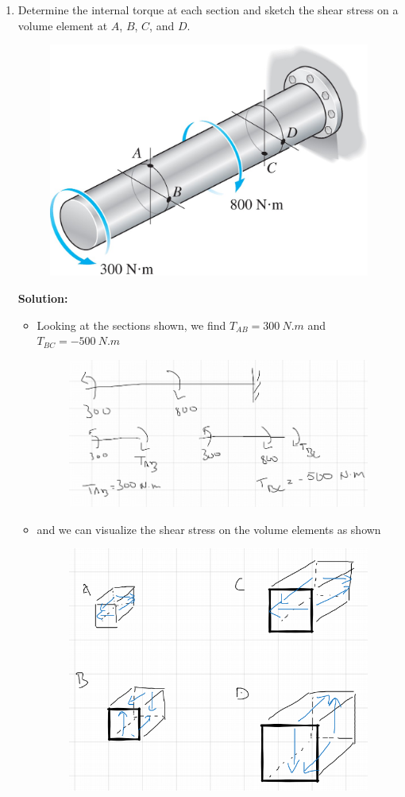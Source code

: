 \documentclass[12pt, oneside]{article}
\begin{document}
\begin{enumerate}
	\item %
		Determine the internal torque at each section and sketch the shear stress on a volume element at $A$, $B$, $C$, and $D$.
		\begin{figure}[H]
			\centering
			\includegraphics[width=0.6\linewidth]{p5-1}
		\end{figure}
		\textbf{Solution:}
		\begin{itemize}
			\item Looking at the sections shown, we find $T_{AB} = \SI{300}{N.m}$ and $T_{BC} = \SI{-500}{N.m}$
			\begin{figure}[H]
				\centering
				\includegraphics[width=0.6\linewidth]{4-1a}
			\end{figure}
		\item and we can visualize the shear stress on the volume elements as shown
			\begin{figure}[H]
				\centering
				\includegraphics[width=0.6\linewidth]{4-1b}
			\end{figure}
		\end{itemize}
	

\end{enumerate}
\end{document}
